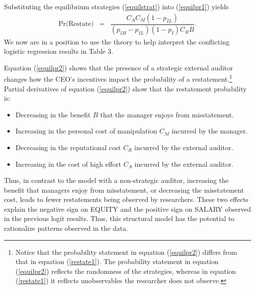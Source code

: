 Substituting the equilibrium strategies (\ref{equilstrat}) into (\ref{equilpr1}) yields
\begin{equation} \label{equilpr2}
\begin{array}{lcl}
\mbox{Pr(Restate)}& = &  \dfrac{C_AC_M(1-p_{IL})}{(p_{IH}-p_{IL})(1-p_I)C_RB}.
\end{array}\end{equation}
We now are in a position to use the theory to help interpret the conflicting logistic regression results
in Table 3. 

Equation (\ref{equilpr2}) shows that the presence of a strategic external auditor
changes how the CEO's incentives impact the probability of a restatement.\footnote{Notice that
the probability statement in equation  (\ref{equilpr2})  differs from that in equation (\ref{restate1}).
The probability statement in equation  (\ref{equilpr2}) reflects the randomness of the
strategies, whereas in equation (\ref{restate1}) it reflects unobservables the researcher 
does not observe.} 
Partial derivatives of equation (\ref{equilpr2}) show that the restatement probability is:
\begin{itemize}
\item Decreasing in the benefit $B$ that the manager enjoys from misstatement.
\item Increasing in the personal cost of manipulation $C_M$ incurred by the manager.
\item Decreasing in the reputational cost $C_R$ incurred by the external auditor.
\item Increasing in the cost of high effort $C_A$ incurred by the external auditor.
\end{itemize}

Thus, in contrast to the model with a non-strategic auditor, increasing the benefit that managers enjoy from misstatement,
or decreasing the misstatement cost, leads to fewer restatements being observed by researchers.
These two effects explain the negative sign on EQUITY and the positive sign on SALARY observed in the previous logit results. Thus, this structural model has the potential to rationalize patterns observed in the data.


